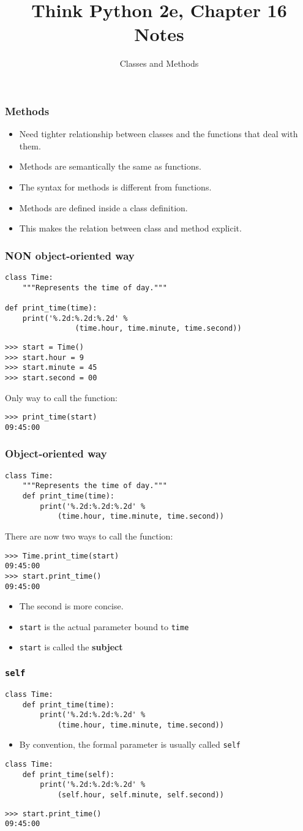 \documentclass{beamer}
\title{Think Python 2e, Chapter 16 Notes}
\author{Classes and Methods}
\newcommand{\bi}{\begin{itemize}}
\newcommand{\li}{\item}
\newcommand{\ei}{\end{itemize}}
\newcommand{\bfr}[1]{\begin{frame}[fragile]\frametitle{{ #1 }}}
\begin{document}
\begin{frame}
\maketitle
\end{frame}



\bfr{Methods}
\bi
\li
Need tighter relationship between classes and the functions
that deal with them.
\li Methods are semantically the same as functions.
\li The syntax for methods is different from functions.
\li Methods are defined inside a class definition.
\li This makes the relation between class and method explicit.
\ei
\end{frame}

\bfr{{\bf NON} object-oriented way}
\begin{lstlisting}
class Time:
    """Represents the time of day."""

def print_time(time):
    print('%.2d:%.2d:%.2d' % 
                (time.hour, time.minute, time.second))
\end{lstlisting}
\begin{lstlisting}
>>> start = Time()
>>> start.hour = 9
>>> start.minute = 45
>>> start.second = 00
\end{lstlisting}
Only way to call the function:
\begin{lstlisting}
>>> print_time(start)
09:45:00
\end{lstlisting}
\end{frame}

\bfr{Object-oriented way}
\begin{lstlisting}
class Time:
    """Represents the time of day."""
    def print_time(time):
        print('%.2d:%.2d:%.2d' % 
            (time.hour, time.minute, time.second))
\end{lstlisting}
There are now two ways to call the function:
\begin{lstlisting}
>>> Time.print_time(start)
09:45:00
>>> start.print_time()
09:45:00
\end{lstlisting}
\bi
\li The second is more concise.
\li \lstinline{start} is the actual parameter bound to \lstinline{time}
\li \lstinline{start} is called the {\bf subject}
\ei
\end{frame}

\bfr{\tt self}
\begin{lstlisting}
class Time:
    def print_time(time):
        print('%.2d:%.2d:%.2d' % 
            (time.hour, time.minute, time.second))
\end{lstlisting}
\bi
\li By convention, the formal parameter is usually called \lstinline{self}
\ei
\begin{lstlisting}
class Time:
    def print_time(self):
        print('%.2d:%.2d:%.2d' % 
            (self.hour, self.minute, self.second))
\end{lstlisting}
\begin{lstlisting}
>>> start.print_time()
09:45:00
\end{lstlisting}
\end{frame}
\end{document}
